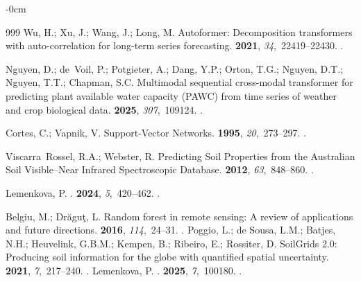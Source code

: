 \documentclass[land,review,accept,pdftex,oneauthor]{Definitions/mdpi}
\begin{document}
\begin{adjustwidth}{-\extralength}{0cm}
\begin{thebibliography}{999}
Wu, H.; Xu, J.; Wang, J.; Long, M.
\newblock Autoformer: Decomposition transformers with auto-correlation for
  long-term series forecasting.
 {\bf 2021},
  {\em 34},~22419--22430.
.

Nguyen, D.; de~Voil, P.; Potgieter, A.; Dang, Y.P.; Orton, T.G.; Nguyen, D.T.;
  Nguyen, T.T.; Chapman, S.C.
\newblock Multimodal sequential cross-modal transformer for predicting plant
  available water capacity (PAWC) from time series of weather and crop
  biological data.
 {\bf 2025}, {\em 307},~109124.
.

Cortes, C.; Vapnik, V.
\newblock Support-Vector Networks.
 {\bf 1995}, {\em 20},~273--297.
.

Viscarra~Rossel, R.A.; Webster, R.
\newblock Predicting Soil Properties from the Australian Soil Visible--Near
  Infrared Spectroscopic Database.
 {\bf 2012}, {\em
  63},~848--860.
.

Lemenkova, P.
.
 {\bf 2024}, {\em 5},~420--462.
.

Belgiu, M.; Dr\u{a}gu\c{t}, L.
\newblock Random forest in remote sensing: A review of applications and future directions.
 {\bf 2016}, {\em 114},~24--31.
.
Poggio, L.; de Sousa, L.M.; Batjes, N.H.; Heuvelink, G.B.M.; Kempen, B.; Ribeiro, E.; Rossiter, D.
\newblock SoilGrids 2.0: Producing soil information for the globe with quantified spatial uncertainty.
 {\bf 2021}, {\em 7},~217--240.
.
Lemenkova, P.
.
 {\bf 2025}, {\em 7},~100180.
.


\end{thebibliography}
\end{adjustwidth}
\end{document}
